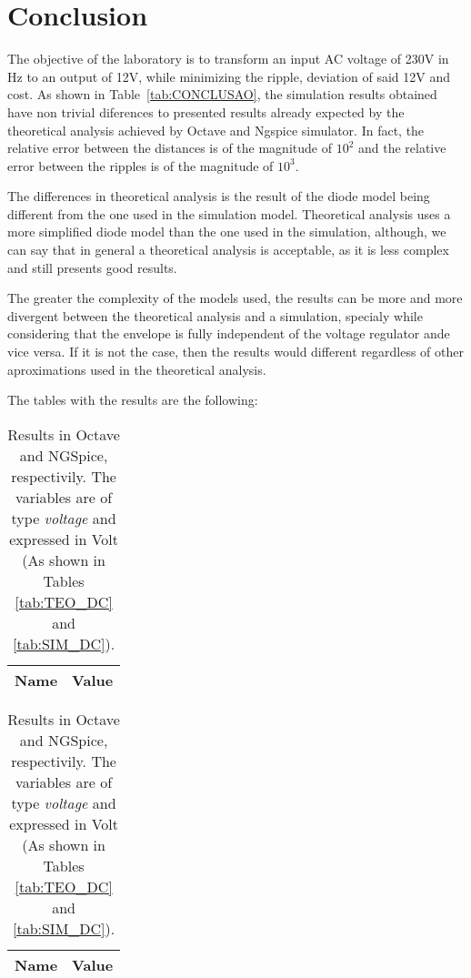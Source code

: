 \section{Conclusion}
\label{sec:conclusion}

The objective of the laboratory is to transform an input AC voltage of 230V in Hz to an output of 12V, while minimizing the ripple, deviation of said 12V and cost. As shown in Table~\ref{tab:CONCLUSAO}, the simulation results obtained have non trivial diferences to presented results already expected by the theoretical analysis achieved by Octave and Ngspice simulator. In fact, the relative error between the distances is of the magnitude of $10^2$ and the relative error between the ripples is of the magnitude of $10^3$.

The differences in theoretical analysis is the result of the diode model being different from the one used in the simulation model. Theoretical analysis uses a more simplified diode model than the one used in the simulation, although, we can say that in general a theoretical analysis is acceptable, as it is less complex and still presents good results.

The greater the complexity of the models used, the results can be more and more divergent between the theoretical analysis and a simulation, specialy while considering that the envelope is fully independent of the voltage regulator ande vice versa. If it is not the case, then the results would different regardless of other aproximations used in the theoretical analysis.

The tables with the results are the following:


\begin{table}[h]
\centering
\begin{minipage}[t]{0.35\linewidth}
 	 \begin{tabular}[t]{|l|r|}
 	   \hline    
 	   {\bf Name} & {\bf Value} \\ \hline
 	   
 	 \end{tabular}
\end{minipage}
\begin{minipage}[t]{0.40\linewidth}
  	\begin{tabular}[t]{|l|r|}
    	\hline    
   		{\bf Name} & {\bf Value} \\ \hline
    	
  	\end{tabular}
\end{minipage}

  	\caption{Results in Octave and NGSpice, respectivily. The variables are of type {\it voltage} and expressed in Volt (As shown in Tables \ref{tab:TEO_DC} and \ref{tab:SIM_DC}).}
\end{table}

